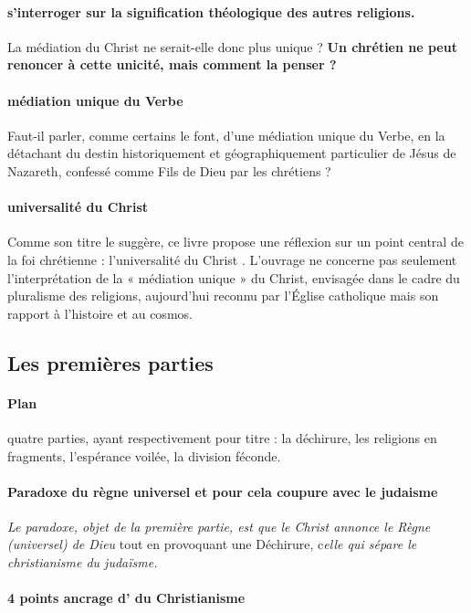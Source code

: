 \paragraph{s’interroger sur la signification théologique des autres religions. } La médiation du Christ ne serait-elle donc plus unique ? \textbf{Un chrétien ne peut renoncer à cette unicité, mais comment la penser ?} 

\paragraph{médiation unique du Verbe } Faut-il parler, comme certains le font, d’une médiation unique du Verbe, en la détachant du destin historiquement et géographiquement particulier de Jésus de Nazareth, confessé comme Fils de Dieu par les chrétiens ? 

\paragraph{universalité du Christ}
 Comme son titre le suggère, ce livre propose une réflexion sur un point central de la foi chrétienne : l’universalité du Christ . L’ouvrage ne concerne pas seulement l’interprétation de la « médiation unique » du Christ, envisagée dans le cadre du pluralisme des religions, aujourd’hui reconnu par l’Église catholique mais son rapport à l'histoire et au cosmos. 
 
\subsection{Les premières parties}

\paragraph{Plan}
 quatre parties, ayant respectivement pour titre : la déchirure, les religions en fragments, l’espérance voilée, la division féconde.
\paragraph{Paradoxe du règne universel et pour cela coupure avec le judaisme}
 \textit{Le paradoxe, objet de la première partie, est que le Christ annonce le Règne (universel) de Dieu} tout en provoquant une Déchirure, c\textit{elle qui sépare le christianisme du judaïsme.}
 
\paragraph{4 points ancrage d' du Christianisme}
 
